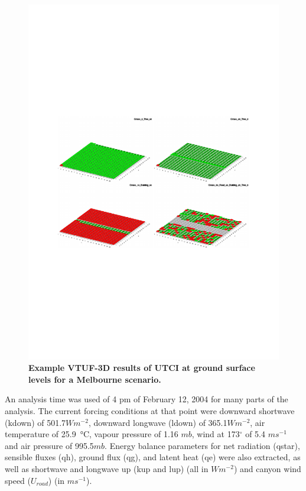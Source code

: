 \documentclass[final,3p,times,authoryear]{elsarticle}
\begin{document}
\begin{figure}
\centering
\includegraphics[page=2,trim={75 240 60 240},clip,scale=0.35]{Figures/PresentationImages.pdf}
\caption{\bf Example VTUF-3D results of UTCI at ground surface levels for a Melbourne scenario.}
 \label{fig:vtufresults}
\end{figure} 


An analysis time was used of 4 pm of February 12, 2004 for many parts of the analysis. The current forcing conditions at that point were downward shortwave (\gls{kdown}) of 501.7$Wm^{-2}$, downward longwave (\gls{ldown}) of 365.1$Wm^{-2}$, air temperature of 25.9\SI{}{\degreeCelsius}, vapour pressure of 1.16 $mb$, wind at 173$^{\circ}$ of 5.4 $ms^{-1}$ and air pressure of 995.5$mb$. Energy balance parameters for net radiation (\gls{qstar}), sensible fluxes (\gls{qh}), ground flux (\gls{qg}), and latent heat (\gls{qe}) were also extracted, as well as shortwave and longwave up (\gls{kup} and \gls{lup}) (all in $Wm^{-2}$) and canyon wind speed ($U_{road}$) (in $ms^{-1}$).
\end{document}
